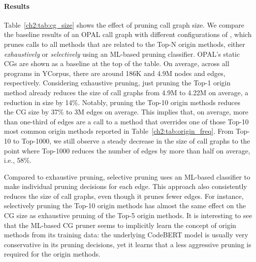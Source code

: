\paragraph{Results}
Table~\ref{ch2:tab:cg_size} shows the effect of pruning call graph size.
We compare the baseline results of an OPAL call graph with different configurations of , which prunes calls to all methods that are related to the Top-N origin methods, either \emph{exhaustively} or \emph{selectively} using an ML-based pruning classifier.
OPAL's static CGs are shown as a baseline at the top of the table. On average, across all programs in YCorpus, there are around 186K and 4.9M nodes and edges, respectively.
Considering exhaustive pruning, just pruning the Top-1 origin method  already reduces the size of call graphs from 4.9M to 4.22M on average, a reduction in size by 14\%. Notably, pruning the Top-10 origin methods reduces the CG size by 37\% to 3M edges on average.
This implies that, on average, more than one-third of edges are a call to a method that overrides one of those Top-10 most common origin methods reported in Table~\ref{ch2:tab:origin_freq}.
From Top-10 to Top-1000, we still observe a steady decrease in the size of call graphs to the point where Top-1000 reduces the number of edges by more than half on average, i.e., 58\%.

Compared to exhaustive pruning, selective pruning uses an ML-based classifier to make individual pruning decisions for each edge.
This approach also consistently reduces the size of call graphs, even though it prunes fewer edges. For instance, selectively pruning the Top-10 origin methods has almost the same effect on the CG size as exhaustive pruning of the Top-5 origin methods.
It is interesting to see that the ML-based CG pruner seems to implicitly learn the concept of origin methods from its training data: the underlying CodeBERT model is usually very conservative in its pruning decisions, yet it learns that a less aggressive pruning is required for the origin methods.

